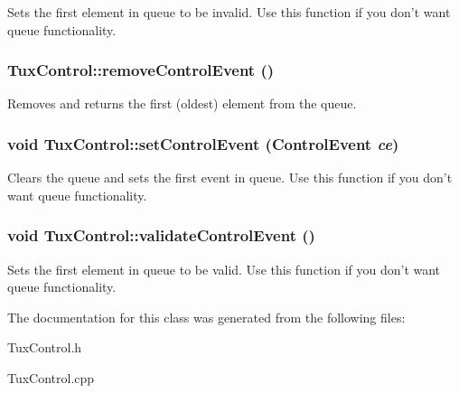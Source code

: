 \label{classTuxControl_aa17c4139818a442407f0c0e8a84a9969}
Sets the first element in queue to be invalid. Use this function if you don't want queue functionality. \hypertarget{classTuxControl_a3f2ed3813a924773ef979c3a03378e24}{
\subsubsection[{removeControlEvent}]{ TuxControl::removeControlEvent ()}}
\label{classTuxControl_a3f2ed3813a924773ef979c3a03378e24}
Removes and returns the first (oldest) element from the queue. \hypertarget{classTuxControl_a36dc3a422109f1ce8858442c2d8e0ee6}{
\subsubsection[{setControlEvent}]{\setlength{\rightskip}{0pt plus 5cm}void TuxControl::setControlEvent ({\bf ControlEvent} {\em ce})}}
\label{classTuxControl_a36dc3a422109f1ce8858442c2d8e0ee6}
Clears the queue and sets the first event in queue. Use this function if you don't want queue functionality. \hypertarget{classTuxControl_adbe78251cc48f86e4ef5395c4374a834}{
\subsubsection[{validateControlEvent}]{\setlength{\rightskip}{0pt plus 5cm}void TuxControl::validateControlEvent ()}}
\label{classTuxControl_adbe78251cc48f86e4ef5395c4374a834}
Sets the first element in queue to be valid. Use this function if you don't want queue functionality. 

The documentation for this class was generated from the following files:\begin{DoxyCompactItemize}
\item 
TuxControl.h\item 
TuxControl.cpp\end{DoxyCompactItemize}
